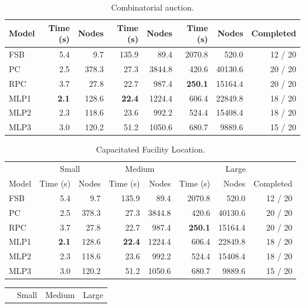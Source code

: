 \begin{scriptsize}
\begin{table}[ht]
\begin{tabular}{lrrrrrrr}
		Model & Time (s) & Nodes  & Time (s) & Nodes & Time (s) & Nodes & Completed\\
		\midrule
		FSB & 5.4 &  9.7  & 135.9 &  89.4 & 2070.8 &  520.0 & 12 / 20\\
		PC &  2.5 & 378.3  &  27.3 &  3844.8 & 420.6 &  40130.6 & 20 / 20 \\
		RPC &  3.7 & 27.8  &  22.7 &  987.4 & \textbf{250.1} &  15164.4 & 20 / 20 \\
		\addlinespace
		MLP1 & \textbf{2.1} & 128.6 & \textbf{22.4} & 1224.4 & 606.4 & 22849.8 & 18 / 20\\
		MLP2 & 2.3          & 118.6 & 23.6          & 992.2 & 524.4 & 15408.4  & 18 / 20\\
		MLP3 & 3.0          & 120.2 & 51.2          & 1050.6 & 680.7 & 9889.6  & 15 / 20\\
		\bottomrule
	\end{tabular}
	\caption{Combinatorial auction.}\label{tab:results1_cauction}
\end{table}
\begin{table}[ht]
	\centering
	\begin{tabular}{lrrrrrrr}
		\toprule
		& \multicolumn{2}{c}{Small} & \multicolumn{2}{c}{Medium} & \multicolumn{3}{c}{Large}\\ \cmidrule(lr){2-3} \cmidrule(lr){4-5} \cmidrule(lr){6-8}
		Model & Time (s) & Nodes  & Time (s) & Nodes & Time (s) & Nodes & Completed\\
		\midrule
		FSB & 5.4 &  9.7  & 135.9 &  89.4 & 2070.8 &  520.0 & 12 / 20\\
		PC &  2.5 & 378.3  &  27.3 &  3844.8 & 420.6 &  40130.6 & 20 / 20 \\
		RPC &  3.7 & 27.8  &  22.7 &  987.4 & \textbf{250.1} &  15164.4 & 20 / 20 \\
		\addlinespace
		MLP1 & \textbf{2.1} & 128.6 & \textbf{22.4} & 1224.4 & 606.4 & 22849.8 & 18 / 20\\
		MLP2 & 2.3          & 118.6 & 23.6          & 992.2 & 524.4 & 15408.4  & 18 / 20\\
		MLP3 & 3.0          & 120.2 & 51.2          & 1050.6 & 680.7 & 9889.6  & 15 / 20\\
		\bottomrule
	\end{tabular}
	\caption{Capacitated Facility Location.}\label{tab:results1_facility}
\end{table}
\begin{table}[ht]
	\centering
	\begin{tabular}{lrrrrrrr}
		\toprule
		& \multicolumn{2}{c}{Small} & \multicolumn{2}{c}{Medium} & \multicolumn{3}{c}{Large}\\ \cmidrule(lr){2-3} \cmidrule(lr){4-5} \cmidrule(lr){6-8}

\end{tabular}
\end{table}
\end{scriptsize}
